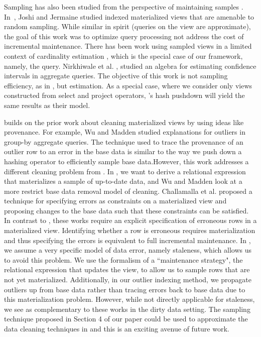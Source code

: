 Sampling has also been studied from the perspective of maintaining samples \cite{DBLP:conf/icde/OlkenR92}.
In~\cite{joshi2008materialized}, Joshi and Jermaine studied indexed materialized views that are amenable to random sampling.
While similar in spirit (queries on the view are approximate), the goal of this work was to optimize query processing not address the cost of incremental maintenance.
There has been work using sampled views in a limited context of cardinality estimation \cite{larson2007cardinality}, which is the special case of our framework, namely, the \countfunc query.
Nirkhiwale et al. \cite{DBLP:journals/pvldb/NirkhiwaleDJ13}, studied an algebra for estimating confidence intervals in aggregate queries.
The objective of this work is not sampling efficiency, as in \svc, but estimation.
As a special case, where we consider only views constructed from select and project operators, \svc's hash pushdown will yield the same results as their model.

\svc builds on the prior work about cleaning materialized views by using ideas like provenance.
For example, Wu and Madden \cite{DBLP:journals/pvldb/0002M13} studied explanations for outliers in group-by aggregate queries. 
The technique used to trace the provenance of an outlier row to an error in the base data is similar to the way we push down a hashing operator to efficiently sample base data.However, this work addresses a different cleaning problem from \svc. 
In \svc, we want to derive a relational expression that materializes a sample of up-to-date data, and Wu and Madden look at a more restrict base data removal model of cleaning. 
Challamalla et al. \cite{DBLP:conf/sigmod/ChalamallaIOP14} proposed a technique for specifying errors as constraints on a materialized view and proposing changes to the base data such that these constraints can be satisfied.
In contrast to \svc, these works require an explicit specification of erroneous rows in a materialized view.
Identifying whether a row is erroneous requires materialization and thus specifying the errors is equivalent to full incremental maintenance. 
In \svc, we assume a very specific model of data error, namely staleness, which allows us to avoid this problem.
We use the formalism of a ``maintenance strategy", the relational expression that updates the view, to allow us to sample rows that are not yet materialized.
Additionally, in our outlier indexing method, we propagate outliers up from base data rather than tracing errors back to base data due to this materialization problem.
However, while not directly applicable for staleness, we see \svc as complementary to these works in the dirty data setting. 
The sampling technique proposed in Section 4 of our paper could be used to approximate the data cleaning techniques in \cite{DBLP:journals/pvldb/0002M13, DBLP:journals/pvldb/0002M13, DBLP:conf/sigmod/ChalamallaIOP14} and this is an exciting avenue of future work. 

